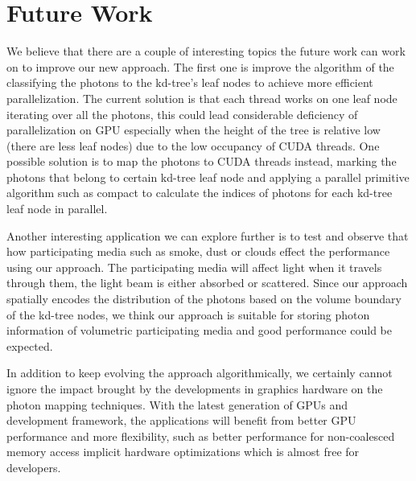 \section{Future Work}

We believe that there are a couple of interesting topics the future work can work on to improve our new approach. The first one is improve the algorithm of the classifying the photons to the kd-tree's leaf nodes to achieve more efficient parallelization. The current solution is that each thread works on one leaf node iterating over all the photons, this could lead considerable deficiency of parallelization on GPU especially when the height of the tree is relative low (there are less leaf nodes) due to the low occupancy of CUDA threads. One possible solution is to map the photons to CUDA threads instead, marking the photons that belong  to certain kd-tree leaf node and applying a parallel primitive algorithm such as compact to calculate the indices of photons for each kd-tree leaf node in parallel.

Another interesting application we can explore further is to test and observe that how participating media such as smoke, dust or clouds effect the performance using our approach. The participating media will affect light when it travels through them, the light beam is either absorbed or scattered. Since our approach spatially encodes the distribution of the photons based on the volume boundary of the kd-tree nodes, we think our approach is suitable for storing photon information of volumetric participating media and good performance could be expected.

In addition to keep evolving the approach algorithmically, we certainly cannot ignore the impact brought by the developments in graphics hardware on the photon mapping techniques. With the latest generation of GPUs and development framework, the applications will benefit from better GPU performance and more flexibility, such as better performance for non-coalesced memory access implicit hardware optimizations which is almost free for developers. 